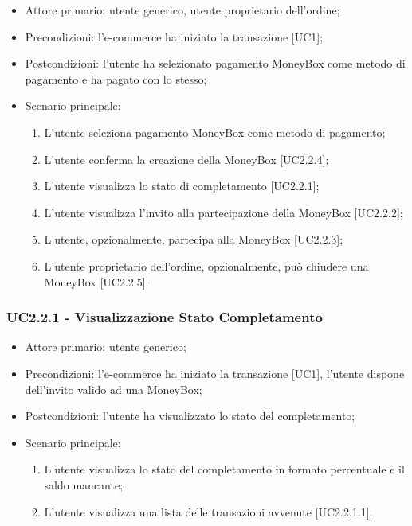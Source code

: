 \begin{itemize}
    \item Attore primario: utente generico, utente proprietario dell'ordine;
    \item Precondizioni: l'e-commerce\glo{} ha iniziato la transazione [UC1];
    \item Postcondizioni: l'utente ha selezionato pagamento MoneyBox\glo{} come metodo di pagamento e ha pagato con lo stesso;
    \item Scenario principale:
          \begin{enumerate}
              \item L'utente seleziona pagamento MoneyBox\glo{} come metodo di pagamento;
              \item L'utente conferma la creazione della MoneyBox\glo{} [UC2.2.4];
              \item L'utente visualizza lo stato di completamento [UC2.2.1];
              \item L'utente visualizza l'invito alla partecipazione della MoneyBox\glo{} [UC2.2.2];
              \item L'utente, opzionalmente, partecipa alla MoneyBox\glo{} [UC2.2.3];
              \item L'utente proprietario dell'ordine, opzionalmente, può chiudere una MoneyBox\glo{} [UC2.2.5].
          \end{enumerate}
\end{itemize}

\subsubsection{UC2.2.1 - Visualizzazione Stato Completamento}

\begin{itemize}
    \item Attore primario: utente generico;
    \item Precondizioni: l'e-commerce\glo{} ha iniziato la transazione [UC1], l'utente dispone dell'invito valido ad una MoneyBox\glo{};
    \item Postcondizioni: l'utente ha visualizzato lo stato del completamento;
    \item Scenario principale:
          \begin{enumerate}
              \item L'utente visualizza lo stato del completamento in formato percentuale e il saldo mancante;
              \item L'utente visualizza una lista delle transazioni avvenute [UC2.2.1.1].
          \end{enumerate}
\end{itemize}

